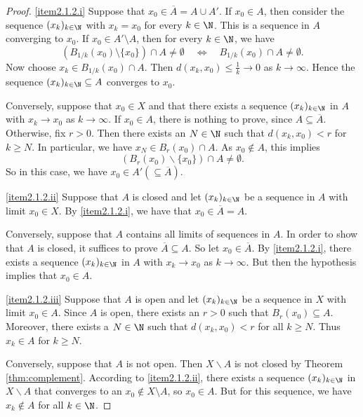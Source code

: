\np

\begin{proof}
\eqref{item2.1.2.i} Suppose that $x_0 \in \overline{A}= A \cup A'$. If $x_0 \in A$, then consider the sequence $(x_k)_{k \in \N}$ with
$x_k = x_0$ for every $k \in \N$. This is a sequence in $A$ converging to $x_0$. If $x_0 \in A'\setminus A$,
then for every $k \in \N$, we have
\[
(B_{1/k}(x_0)\setminus\{x_0\}) \cap A \not= \emptyset \quad \Leftrightarrow \quad B_{1/k}(x_0) \cap A \not= \emptyset.
\]
Now choose $x_k \in B_{1/k}(x_0) \cap A$. Then $d(x_k,x_0) \le \frac{1}{k} \to 0$ as $k \to \infty$.
Hence the sequence $(x_k)_{k \in \N}\subseteq A$ converges to $x_0$.

Conversely, suppose that $x_0 \in X$ and that there exists a sequence $(x_k)_{k \in \N}$ in $A$
with $x_k \to x_0$ as $k \to \infty$. If $x_0 \in A$, there is nothing to prove, since $A\subseteq \overline{A}$. Otherwise,
fix $r > 0$. Then there exists an $N \in \N$ such that $d(x_k,x_0) < r$ for $k \ge N$.
In particular, we have $x_N \in B_r(x_0) \cap A$. As $x_0 \not\in A$, this implies
\[
\left(B_r(x_0) \backslash \{x_0\}\right) \cap A \not= \emptyset.
\]
So in this case, we have $x_0 \in A' (\subseteq \overline A)$.

\np

\eqref{item2.1.2.ii} Suppose that $A$ is closed and let $(x_k)_{k \in \N}$ be a sequence
in $A$ with limit $x_0 \in X$. By \eqref{item2.1.2.i}, we have that $x_0 \in \overline{A} = A$.

Conversely, suppose that $A$ contains all limits of sequences in $A$. In order to show
that $A$ is closed, it suffices to prove $\overline{A} \subseteq A$. So let $x_0 \in \overline{A}$.
By \eqref{item2.1.2.i}, there exists a sequence $(x_k)_{k \in \N}$ in $A$ with $x_k \to x_0$
as $k \to \infty$. But then the hypothesis implies that $x_0 \in A$.

\bis

\eqref{item2.1.2.iii} Suppose that $A$ is open and let $(x_k)_{k \in \N}$ be a sequence in $X$
with limit $x_0 \in A$. Since $A$ is open, there exists an $r > 0$ such that $B_r(x_0) \subseteq A$.
Moreover, there exists a $N \in \N$ such that $d(x_k,x_0) < r$ for all $k \ge N$.
Thus $x_k \in A$ for $k \ge N$.

Conversely, suppose that $A$ is not open. Then $X \backslash A$ is not closed
by Theorem \ref{thm:complement}. According to \eqref{item2.1.2.ii}, there exists
a sequence $(x_k)_{k \in \N}$ in $X \backslash A$ that converges to an $x_0 \notin X\setminus A$, so $x_0\in A$.
But for this sequence, we have $x_k \not\in A$ for all $k \in \N$.
\end{proof}



